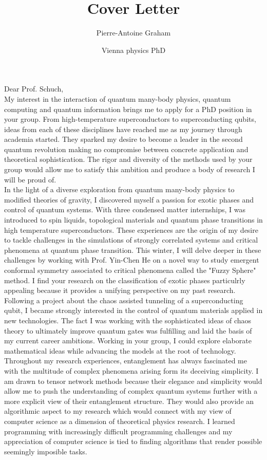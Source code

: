 \documentclass[12pt]{article}
\title{Cover Letter}
\author{Pierre-Antoine Graham}
\date{Vienna physics PhD}
\begin{document}
 

\maketitle
\vspace{0.1cm}
Dear Prof. Schuch,\\

My interest in the interaction of quantum many-body physics, quantum computing and quantum information brings me to apply for a PhD position in your group. From high-temperature superconductors to superconducting qubits, ideas from each of these disciplines have reached me as my journey through academia started. They sparked my desire to become a leader in the second quantum revolution making no compromise between concrete application and theoretical sophistication. The rigor and diversity of the methods used by your group would allow me to satisfy this ambition and produce a body of research I will be proud of.\\

In the light of a diverse exploration from quantum many-body physics to modified theories of gravity, I discovered myself a passion for exotic phases and control of quantum systems. With three condensed matter internships, I was introduced to spin liquids, topological materials and quantum phase transitions in high temperature superconductors. These experiences are the origin of my desire to tackle challenges in the simulations of strongly correlated systems and critical phenomena at quantum phase transition. This winter, I will delve deeper in these challenges by working with Prof. Yin-Chen He on a novel way to study emergent conformal symmetry associated to critical phenomena called the "Fuzzy Sphere" method. I find your research on the classification of exotic phases particulrly appealing because it provides a unifying perspective on my past research.\\ 

Following a project about the chaos assisted tunneling of a superconducting qubit, I became strongly interested in the control of quantum materials applied in new technologies. The fact I was working with the sophisticated ideas of chaos theory to ultimately improve quantum gates was fulfilling and laid the basis of my current career ambitions. Working in your group, I could explore elaborate mathematical ideas while advancing the models at the root of technology.\\

Throughout my research experiences, entanglement has always fascinated me with the multitude of complex phenomena arising form its deceiving simplicity. I am drawn to tensor network methods because their elegance and simplicity would allow me to push the understanding of complex quantum systems further with a more explicit view of their entanglement structure. They would also provide an algorithmic aspect to my research which would connect with my view of computer science as a dimension of theoretical physics research. I learned programming with increasingly difficult programming challenges and my appreciation of computer science is tied to finding algorithms that render possible seemingly imposible tasks.  \\
\end{document}
